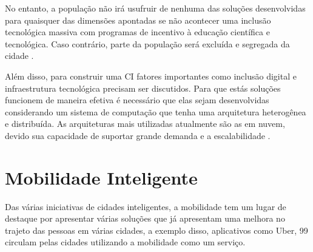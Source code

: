 No entanto, a população não irá usufruir de nenhuma das soluções desenvolvidas para quaisquer das dimensões apontadas se não acontecer uma inclusão tecnológica massiva com programas de incentivo à educação científica e tecnológica. Caso contrário, parte da população será excluída e segregada da cidade \cite{patricia}.

Além disso, para construir uma CI fatores importantes como inclusão digital e infraestrutura tecnológica precisam ser discutidos. Para que estás soluções funcionem de maneira efetiva é necessário que elas sejam desenvolvidas considerando um sistema de computação que tenha uma arquitetura heterogênea e distribuída. As arquiteturas mais utilizadas atualmente são as em nuvem, devido sua capacidade de suportar grande demanda e a escalabilidade \cite{patricia}. 

\section{Mobilidade Inteligente}

Das várias iniciativas de cidades inteligentes, a mobilidade tem um lugar de destaque por apresentar várias soluções que já apresentam uma melhora no trajeto das pessoas em várias cidades, a exemplo disso, aplicativos como Uber, 99 circulam pelas cidades utilizando a mobilidade como um serviço.

